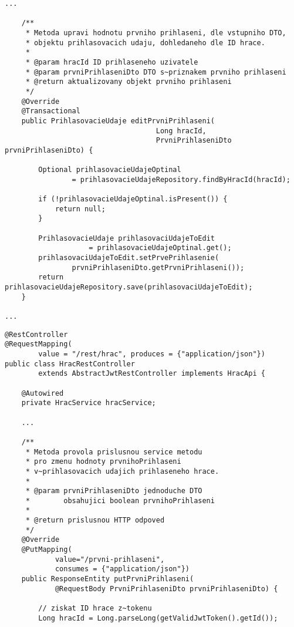 \documentclass[twoside, 12pt]{article}
\begin{document}
{{\begin{lstlisting}
...

    /**
     * Metoda upravi hodnotu prvniho prihlaseni, dle vstupniho DTO,
     * objektu prihlasovacich udaju, dohledaneho dle ID hrace.
     *
     * @param hracId ID prihlaseneho uzivatele
     * @param prvniPrihlaseniDto DTO s~priznakem prvniho prihlaseni
     * @return aktualizovany objekt prvniho prihlaseni
     */
    @Override
    @Transactional
    public PrihlasovacieUdaje editPrvniPrihlaseni(
                                    Long hracId,
                                    PrvniPrihlaseniDto prvniPrihlaseniDto) {

        Optional prihlasovacieUdajeOptinal
                = prihlasovacieUdajeRepository.findByHracId(hracId);

        if (!prihlasovacieUdajeOptinal.isPresent()) {
            return null;
        }

        PrihlasovacieUdaje prihlasovaciUdajeToEdit
                    = prihlasovacieUdajeOptinal.get();
        prihlasovaciUdajeToEdit.setPrvePrihlasenie(
                prvniPrihlaseniDto.getPrvniPrihlaseni());
        return prihlasovacieUdajeRepository.save(prihlasovaciUdajeToEdit);
    }

...
\end{lstlisting}

\clearpage


\begin{lstlisting}
@RestController
@RequestMapping(
        value = "/rest/hrac", produces = {"application/json"})
public class HracRestController
        extends AbstractJwtRestController implements HracApi {

    @Autowired
    private HracService hracService;

    ...

    /**
     * Metoda provola prislusnou service metodu
     * pro zmenu hodnoty prvnihoPrihlaseni
     * v~prihlasovacich udajich prihlaseneho hrace.
     *
     * @param prvniPrihlaseniDto jednoduche DTO
     *        obsahujici boolean prvnihoPrihlaseni
     *
     * @return prislusnou HTTP odpoved
     */
    @Override
    @PutMapping(
            value="/prvni-prihlaseni",
            consumes = {"application/json"})
    public ResponseEntity putPrvniPrihlaseni(
            @RequestBody PrvniPrihlaseniDto prvniPrihlaseniDto) {

        // ziskat ID hrace z~tokenu
        Long hracId = Long.parseLong(getValidJwtToken().getId());


\end{lstlisting}}}
\end{document}
